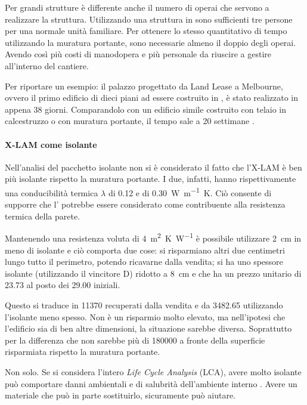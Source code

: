 Per grandi strutture è differente anche il numero di operai che servono a realizzare la struttura. Utilizzando una struttura in \xlam{} sono sufficienti tre persone per una normale unità familiare. Per ottenere lo stesso quantitativo di tempo utilizzando la muratura portante, sono necessarie almeno il doppio degli operai. Avendo così più costi di manodopera e più personale da riuscire a gestire all'interno del cantiere. 

Per riportare un esempio: il palazzo progettato da Land Lease a Melbourne, ovvero il primo edificio di dieci piani ad essere costruito in \xlam, è stato realizzato in appena 38 giorni. Comparandolo con un edificio simile costruito con telaio in calcestruzzo o con muratura portante, il tempo sale a 20 settimane \cite[39]{10storey}. 


\paragraph{X-LAM come isolante}
Nell'analisi del pacchetto isolante non si è considerato il fatto che l'X-LAM è ben più isolante rispetto la muratura portante. I due, infatti, hanno rispettivamente una conducibilità termica $\lambda$ di \SI{0.12}{} e di \SI{0.30}{W\per\metre K}.
Ciò consente di supporre che l'\xlam{} potrebbe essere considerato come contribuente alla resistenza termica della parete. 

Mantenendo una resistenza voluta di \SI{4}{\square\metre K\per W} è possibile utilizzare \SI{2}{\centi\metre} in meno di isolante e ciò comporta due cose: si risparmiano altri due centimetri lungo tutto il perimetro, potendo ricavarne dalla vendita; si ha uno spessore isolante (utilizzando il vincitore D) ridotto a \SI{8}{\centi\metre} e che ha un prezzo unitario di \SI{23.73}{\teuro} al posto dei \SI{29.00}{\teuro} iniziali.

Questo si traduce in \SI{11370}{\teuro} recuperati dalla vendita e da \SI{3482.65}{\teuro} utilizzando l'isolante meno spesso. 
Non è un risparmio molto elevato, ma nell'ipotesi che l'edificio sia di ben altre dimensioni, la situazione sarebbe diversa. 
Soprattutto per la differenza che non sarebbe più di \SI{180000}{\teuro} a fronte della superficie risparmiata rispetto la muratura portante.

Non solo. 
Se si considera l'intero \textit{Life Cycle Analysis} (LCA), avere molto isolante può comportare danni ambientali e di salubrità dell'ambiente interno \cite{reijnders_comprehensiveness_1999}. 
Avere un materiale che può in parte sostituirlo, sicuramente può aiutare. 

